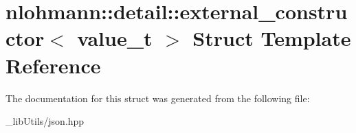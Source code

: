 \hypertarget{structnlohmann_1_1detail_1_1external__constructor}{}\section{nlohmann\+:\+:detail\+:\+:external\+\_\+constructor$<$ value\+\_\+t $>$ Struct Template Reference}
\label{structnlohmann_1_1detail_1_1external__constructor}


The documentation for this struct was generated from the following file\+:\begin{DoxyCompactItemize}
\item 
\+\_\+lib\+Utils/json.\+hpp\end{DoxyCompactItemize}
